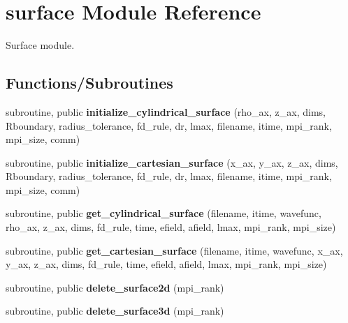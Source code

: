 \hypertarget{namespacesurface}{}\section{surface Module Reference}
\label{namespacesurface}


Surface module.  


\subsection*{Functions/\+Subroutines}
\begin{DoxyCompactItemize}
\item 
\mbox{\label{namespacesurface_a47af91cd7f1d5f28fd9f1dfcd5ff2afa}} 
subroutine, public {\bfseries initialize\+\_\+cylindrical\+\_\+surface} (rho\+\_\+ax, z\+\_\+ax, dims, Rboundary, radius\+\_\+tolerance, fd\+\_\+rule, dr, lmax, filename, itime, mpi\+\_\+rank, mpi\+\_\+size, comm)
\item 
\mbox{\label{namespacesurface_a84785222e1c493ba239e9c3c0b269d55}} 
subroutine, public {\bfseries initialize\+\_\+cartesian\+\_\+surface} (x\+\_\+ax, y\+\_\+ax, z\+\_\+ax, dims, Rboundary, radius\+\_\+tolerance, fd\+\_\+rule, dr, lmax, filename, itime, mpi\+\_\+rank, mpi\+\_\+size, comm)
\item 
\mbox{\label{namespacesurface_a512ae9dbd39eaf12e66d733749d65642}} 
subroutine, public {\bfseries get\+\_\+cylindrical\+\_\+surface} (filename, itime, wavefunc, rho\+\_\+ax, z\+\_\+ax, dims, fd\+\_\+rule, time, efield, afield, lmax, mpi\+\_\+rank, mpi\+\_\+size)
\item 
\mbox{\label{namespacesurface_ac2ef5ef833ecd09a52367e4eb4d75512}} 
subroutine, public {\bfseries get\+\_\+cartesian\+\_\+surface} (filename, itime, wavefunc, x\+\_\+ax, y\+\_\+ax, z\+\_\+ax, dims, fd\+\_\+rule, time, efield, afield, lmax, mpi\+\_\+rank, mpi\+\_\+size)
\item 
\mbox{\label{namespacesurface_a38df72433aa65cbfc858d35b9ae23813}} 
subroutine, public {\bfseries delete\+\_\+surface2d} (mpi\+\_\+rank)
\item 
\mbox{\label{namespacesurface_abe2d94c449094d9ac327ef3f5f7969f9}} 
subroutine, public {\bfseries delete\+\_\+surface3d} (mpi\+\_\+rank)
\end{DoxyCompactItemize}


